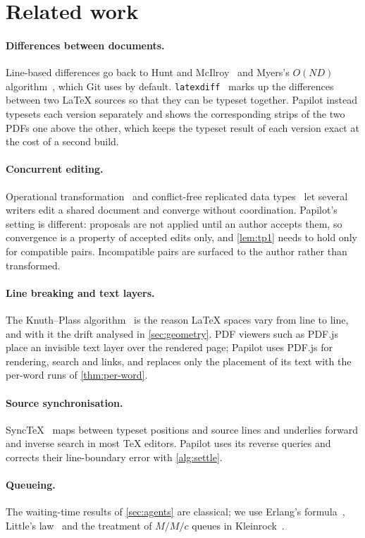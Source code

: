\section{Related work}
\label{sec:related}

\paragraph{Differences between documents.}
Line-based differences go back to Hunt and McIlroy~\cite{hunt1976} and Myers's
$O(ND)$ algorithm~\cite{myers1986}, which Git uses by default.
\texttt{latexdiff}~\cite{latexdiff} marks up the differences between two
\LaTeX{} sources so that they can be typeset together. Papilot instead
typesets each version separately and shows the corresponding strips of the
two PDFs one above the other, which keeps the typeset result of each version
exact at the cost of a second build.

\paragraph{Concurrent editing.}
Operational transformation~\cite{ellis1989} and conflict-free replicated data
types~\cite{shapiro2011} let several writers edit a shared document and converge
without coordination. Papilot's setting is different: proposals are not applied
until an author accepts them, so convergence is a property of accepted edits
only, and \cref{lem:tp1} needs to hold only for compatible pairs. Incompatible
pairs are surfaced to the author rather than transformed.

\paragraph{Line breaking and text layers.}
The Knuth--Plass algorithm~\cite{knuth1981} is the reason \LaTeX{} spaces vary
from line to line, and with it the drift analysed in \cref{sec:geometry}. PDF
viewers such as PDF.js~\cite{pdfjs} place an invisible text layer over the
rendered page; Papilot uses PDF.js for rendering, search and links, and
replaces only the placement of its text with the per-word runs of
\cref{thm:per-word}.

\paragraph{Source synchronisation.}
SyncTeX~\cite{laurens2008} maps between typeset positions and source lines and
underlies forward and inverse search in most \TeX{} editors. Papilot uses its
reverse queries and corrects their line-boundary error with
\cref{alg:settle}.

\paragraph{Queueing.}
The waiting-time results of \cref{sec:agents} are classical; we use Erlang's
formula~\cite{erlang1917}, Little's law~\cite{little1961} and the treatment of
$M/M/c$ queues in Kleinrock~\cite{kleinrock1975}.
